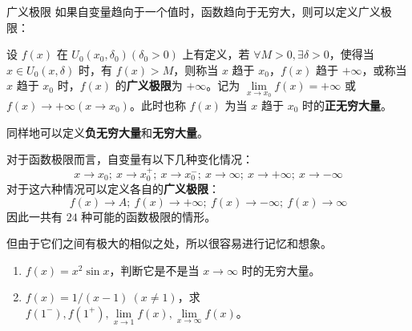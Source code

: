 \begin{definition}{广义极限}
如果自变量趋向于一个值时，函数趋向于无穷大，则可以定义广义极限：

  设 $f(x)$ 在 $U_0(x_0,\delta_0)(\delta_0>0)$ 上有定义，若 $\forall M>0,\exists \delta>0$，使得当 $x\in U_0(x,\delta)$ 时，有 $f(x)>M$，则称当 $x$ 趋于 $x_0$，$f(x)$ 趋于 $+\infty$，或称当 $x$ 趋于 $x_0$ 时，$f(x)$ 的\textbf{广义极限}为 $+\infty$。记为 $\lim\limits_{x\rightarrow x_0}f(x)=+\infty$ 或 $f(x)\rightarrow +\infty(x\rightarrow x_0)$。此时也称 $f(x)$ 为当 $x$ 趋于 $x_0$ 时的\textbf{正无穷大量}。

  同样地可以定义\textbf{负无穷大量}和\textbf{无穷大量}。
\end{definition}

  

  对于函数极限而言，自变量有以下几种变化情况：
\begin{equation}
  x\rightarrow x_0;\ x\rightarrow x_0^+;\ x\rightarrow x_0^{-};\ x\rightarrow \infty;\ x\rightarrow +\infty;\ x\rightarrow -\infty
\end{equation}
  对于这六种情况可以定义各自的\textbf{广义极限}：
\begin{equation}
  f(x)\rightarrow A;\ f(x)\rightarrow +\infty;\ f(x)\rightarrow -\infty;\ f(x)\rightarrow \infty
\end{equation}
  因此一共有 $24$ 种可能的函数极限的情形。

  但由于它们之间有极大的相似之处，所以很容易进行记忆和想象。

\begin{exercise}{}
\begin{enumerate}
\item $f(x)=x^2\sin x$，判断它是不是当 $x\rightarrow \infty$ 时的无穷大量。
\item $f(x)=1/(x-1)\ (x\neq 1)$，求 $f(1^-),f(1^+),\lim\limits_{x\rightarrow 1}f(x),\lim\limits_{x\rightarrow \infty}f(x)$。
\end{enumerate}
\end{exercise}